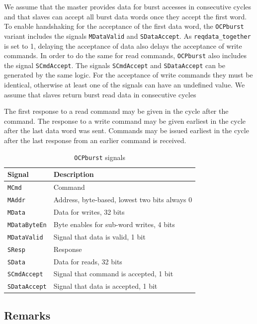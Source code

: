 \documentclass[a4paper,fontsize=10pt,twoside,DIV15,BCOR12mm,headinclude=true,footinclude=false,pagesize,bibtotoc]{scrbook}
\newcommand{\code}[1]{{\texttt{#1}}}
\begin{document}
We assume that the master provides data for burst accesses in
consecutive cycles and that slaves can accept all burst data words
once they accept the first word. To enable handshaking for the
acceptance of the first data word, the \code{OCPburst} variant
includes the signals \code{MDataValid} and \code{SDataAccept}. As
\code{reqdata\_together} is set to 1, delaying the acceptance of data
also delays the acceptance of write commands. In order to do the same
for read commands, \code{OCPburst} also includes the signal
\code{SCmdAccept}. The signals \code{SCmdAccept} and
\code{SDataAccept} can be generated by the same logic. For the
acceptance of write commands they must be identical, otherwise at
least one of the signals can have an undefined value. We assume that
slaves return burst read data in consecutive cycles

The first response to a read command may be given in the cycle after
the command. The response to a write command may be given earliest in
the cycle after the last data word was sent. Commands may be issued
earliest in the cycle after the last response from an earlier command
is received.

\begin{table}
  \centering
  \caption{\code{OCPburst} signals}
  \label{tab:burstsignals}
  \begin{tabular}{ll}
    \toprule
    Signal & Description \\
    \midrule
    \code{MCmd} & Command \\
    \code{MAddr} & Address, byte-based, lowest two bits always 0 \\
    \code{MData} & Data for writes, 32 bits \\
    \code{MDataByteEn} & Byte enables for sub-word writes, 4 bits \\
    \code{MDataValid} & Signal that data is valid, 1 bit \\
    \cmidrule{1-2}
    \code{SResp} & Response \\
    \code{SData} & Data for reads, 32 bits \\
    \code{SCmdAccept} & Signal that command is accepted, 1 bit \\
    \code{SDataAccept} & Signal that data is accepted, 1 bit \\
    \bottomrule
  \end{tabular}
\end{table}

\subsection{Remarks}
\end{document}
